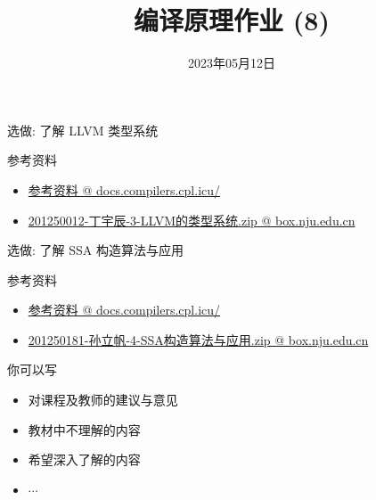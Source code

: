 \documentclass[a4paper, justified]{tufte-handout}
\title{编译原理作业 (8)}
\date{2023年05月12日}
\begin{document}
\maketitle
\noplagiarism %
\begin{abstract}
\end{abstract}
\beginrequired

\begin{problem}
  选做: 了解 LLVM 类型系统

  \noindent 参考资料
  \begin{itemize}
    \item \href{http://docs.compilers.cpl.icu/#/2022/hw?id=_3-llvm-\%e7\%9a\%84\%e7\%b1\%bb\%e5\%9e\%8b\%e7\%b3\%bb\%e7\%bb\%9f}{参考资料 @ docs.compilers.cpl.icu/}
    \item \href{https://box.nju.edu.cn/f/17614427832b40298d2e/}{201250012-丁宇辰-3-LLVM的类型系统.zip @ box.nju.edu.cn}
  \end{itemize}
\end{problem}

\begin{solution}
\end{solution}


\begin{problem}
  选做: 了解 SSA 构造算法与应用

  \noindent 参考资料
  \begin{itemize}
    \item \href{http://docs.compilers.cpl.icu/#/2022/hw?id=_4-ssa-\%e6\%9e\%84\%e9\%80\%a0\%e7\%ae\%97\%e6\%b3\%95\%e4\%b8\%8e\%e5\%ba\%94\%e7\%94\%a8}{参考资料 @ docs.compilers.cpl.icu/}
    \item \href{https://box.nju.edu.cn/f/8eef8189c6784476a405/}{201250181-孙立帆-4-SSA构造算法与应用.zip @ box.nju.edu.cn}
  \end{itemize}
\end{problem}

\begin{solution}
\end{solution}



\beginfb

你可以写
\begin{itemize}
  \item 对课程及教师的建议与意见
  \item 教材中不理解的内容
  \item 希望深入了解的内容
  \item $\cdots$
\end{itemize}
\end{document}

